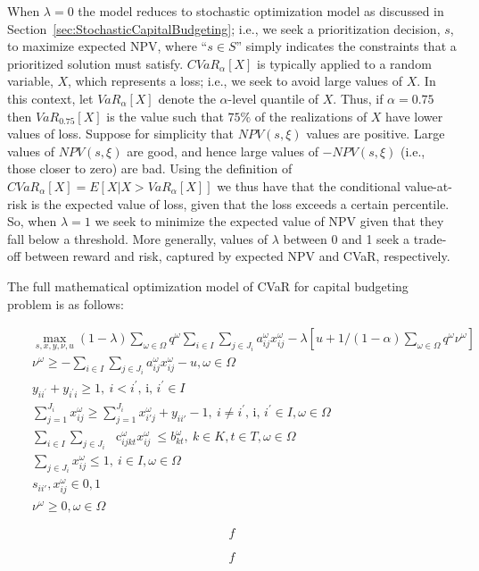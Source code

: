 When $\lambda = 0$ the model reduces to stochastic optimization model as
discussed in Section~\ref{sec:StochasticCapitalBudgeting}; i.e., we seek
a prioritization decision, $s$, to maximize expected NPV, where ``$s \in S$''
simply indicates the constraints that a prioritized solution must satisfy.
$CVaR_\alpha [X]$ is typically applied to a random variable, $X$, which
represents a loss; i.e., we seek to avoid large values of $X$. In this
context, let $VaR_\alpha [X]$ denote the $\alpha$-level quantile of $X$.
Thus, if $\alpha = 0.75$ then $VaR_0.75 [X]$ is the value such that $75\%$
of the realizations of $X$ have lower values of loss. Suppose for simplicity
that $NPV(s, \xi)$ values are positive. Large values of $NPV(s, \xi)$ are
good, and hence large values of $-NPV(s, \xi)$ (i.e., those closer to zero)
are bad. Using the definition of $CVaR_\alpha [X] = E[X|X > VaR_\alpha [X]]$
we thus have that the conditional value-at-risk is the expected value of loss,
given that the loss exceeds a certain percentile. So, when $\lambda = 1$ we
seek to minimize the expected value of NPV given that they fall below a
threshold. More generally, values of $\lambda$ between 0 and 1 seek a trade-off
between reward and risk, captured by expected NPV and CVaR, respectively.

The full mathematical optimization model of CVaR for capital budgeting problem
is as follows:

\begin{subequations}\label{fullDRO}
\begin{eqnarray}
& & \max_{s, x, y, \nu, u} (1-\lambda) \sum _{ \omega  \in  \Omega }^{}q^{ \omega } \sum _{i \in I}^{} \sum _{j \in J_{i}}^{}a_{ij}^{ \omega }x_{ij}^{ \omega } - \lambda[u+1/(1-\alpha)\sum_{\omega \in \Omega} q^\omega \nu^\omega] \\
& & \nu^\omega \ge - \sum _{i \in I}^{} \sum _{j \in J_{i}}^{}a_{ij}^{ \omega }x_{ij}^{ \omega } - u, \omega \in \Omega \\
& & y_{ii^{'}}+y_{i^{'}i} \geq 1,~ i<i^{'}\text{, i, }i^{'} \in I \\
& & \sum_{j=1}^{J_i} x_{ij}^\omega \geq \sum_{j=1}^{J_i} x_{i'j}^\omega + y_{ii'} -1,~ i \neq i^{'}\text{, i, }i^{'} \in I,  \omega  \in  \Omega \\
& & \sum _{i \in I}^{} \sum _{j \in J_{i}}^{}\text{~ c}_{ijkt}^{ \omega }x_{ij}^{ \omega }~  \leq  b_{kt}^{ \omega },~ k \in K, t \in T,  \omega  \in  \Omega \\
& & \sum_{j\in J_i} x_{ij}^{ \omega } \leq 1,~ i \in I, \omega  \in  \Omega \\
& & s_{ii'}, x_{ij}^\omega \in {0, 1} \\
& & \nu^\omega \ge 0, \omega \in \Omega
\end{eqnarray}
\end{subequations}





\begin{equation}
f
\end{equation}

\begin{subequations}\label{WassersteinConstraints}
\begin{eqnarray}
f
\end{eqnarray}
\end{subequations}
